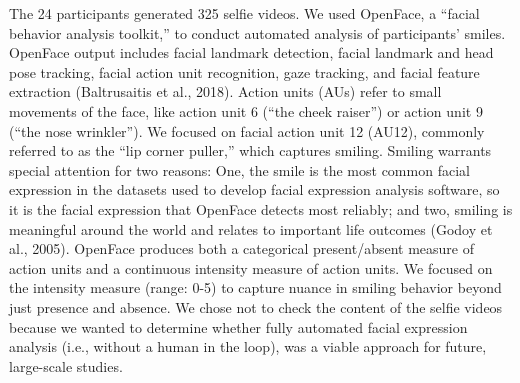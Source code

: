 \documentclass[authordate, empirical]{jote-new-article}
\begin{document}
The 24 participants generated 325 selfie videos. We used OpenFace, a “facial behavior analysis toolkit,” to conduct automated analysis of participants' smiles. OpenFace output includes facial landmark detection, facial landmark and head pose tracking, facial action unit recognition, gaze tracking, and facial feature extraction (Baltrusaitis et al., 2018). Action units (AUs) refer to small movements of the face, like action unit 6 (“the cheek raiser”) or action unit 9 (“the nose wrinkler”). We focused on facial action unit 12 (AU12), commonly referred to as the “lip corner puller,” which captures smiling. Smiling warrants special attention for two reasons: One, the smile is the most common facial expression in the datasets used to develop facial expression analysis software, so it is the facial expression that OpenFace detects most reliably; and two, smiling is meaningful around the world and relates to important life outcomes (Godoy et al., 2005). OpenFace produces both a categorical present/absent measure of action units and a continuous intensity measure of action units. We focused on the intensity measure (range: 0-5) to capture nuance in smiling behavior beyond just presence and absence. We chose not to check the content of the selfie videos because we wanted to determine whether fully automated facial expression analysis (i.e., without a human in the loop), was a viable approach for future, large-scale studies.
\end{document}
